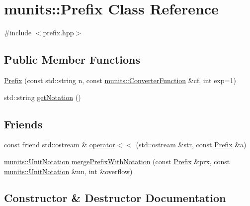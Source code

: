 \hypertarget{classmunits_1_1_prefix}{}\section{munits\+:\+:Prefix Class Reference}
\label{classmunits_1_1_prefix}


{\ttfamily \#include $<$prefix.\+hpp$>$}

\subsection*{Public Member Functions}
\begin{DoxyCompactItemize}
\item 
\hyperlink{classmunits_1_1_prefix_a4696b743ad2374b9833a0628c55733b8}{Prefix} (const std\+::string n, const \hyperlink{classmunits_1_1_converter_function}{munits\+::\+Converter\+Function} \&cf, int exp=1)
\item 
std\+::string \hyperlink{classmunits_1_1_prefix_a3cc3d1b3ed55c756b8baa98ea1369e65}{get\+Notation} ()
\end{DoxyCompactItemize}
\subsection*{Friends}
\begin{DoxyCompactItemize}
\item 
const friend std\+::ostream \& \hyperlink{classmunits_1_1_prefix_a6dfdc18ee1d503dce5f170b4b04afa36}{operator$<$$<$} (std\+::ostream \&str, const \hyperlink{classmunits_1_1_prefix}{Prefix} \&a)
\item 
\hyperlink{classmunits_1_1_unit_notation}{munits\+::\+Unit\+Notation} \hyperlink{classmunits_1_1_prefix_a69fa2333393cf327262c44ec78eef70b}{merge\+Prefix\+With\+Notation} (const \hyperlink{classmunits_1_1_prefix}{Prefix} \&prx, const \hyperlink{classmunits_1_1_unit_notation}{munits\+::\+Unit\+Notation} \&un, int \&overflow)
\end{DoxyCompactItemize}


\subsection{Constructor \& Destructor Documentation}
\mbox{\label{classmunits_1_1_prefix_a4696b743ad2374b9833a0628c55733b8}} 
